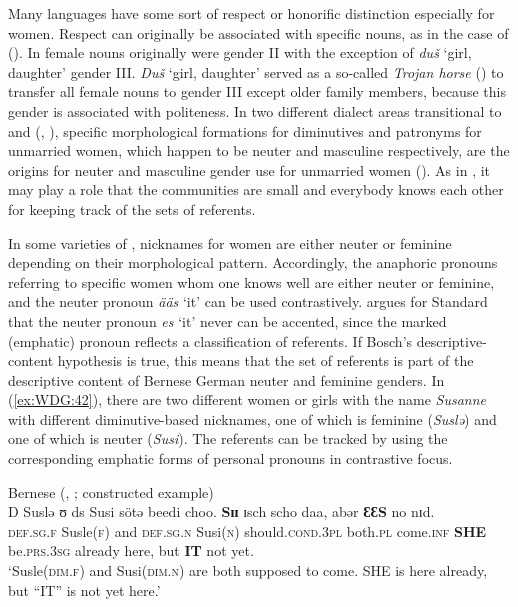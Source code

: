 \documentclass[output=collectionpaper]{langsci/langscibook}
\begin{document}
\largerpage
Many languages have some sort of respect or honorific distinction especially for women. Respect can originally be associated with specific nouns, as in the case of  (). In  female nouns originally were gender II with the exception of \textit{duš} `girl, daughter' gender III. \textit{Duš} `girl, daughter' served as a so-called \emph{Trojan horse} (\citealt[100]{Corbett1991}) to transfer all female nouns to gender III except older family members, because this gender is associated with politeness. In two different  dialect areas transitional to  and  (, ), specific morphological formations for diminutives and patronyms for unmarried women, which happen to be neuter and masculine respectively, are the origins for neuter and masculine gender use for unmarried women (\citealt[101]{Corbett1991}). As in , it may play a role that the communities are small and everybody knows each other for keeping track of the sets of referents.

In some varieties of , nicknames for women are either neuter or feminine depending on their morphological pattern. Accordingly, the anaphoric pronouns referring to specific women whom one knows well are either neuter or feminine, and the neuter pronoun \textit{ääs} `it' can be used contrastively. \cite[218]{Bosch1988} argues for Standard  that the neuter pronoun \textit{es} `it' never can be accented, since the marked (emphatic) pronoun reflects a classification of referents. If Bosch's descriptive-content hypothesis is true, this means that the set of referents is part of the descriptive content of Bernese German neuter and feminine genders. In (\ref{ex:WDG:42}), there are two different women or girls with the name \textit{Susanne} with different diminutive-based nicknames, one of which is feminine (\textit{Suslǝ}) and one of which is neuter (\textit{Susi}). The referents can be tracked by using the corresponding emphatic forms of personal pronouns in contrastive focus.

\ea\label{ex:WDG:42}
Bernese  (, ; constructed example)\\
\gll D	Suslǝ	ʊ	ds	Susi	sötǝ	beedi	choo. \textbf{Sɪɪ}	ɪsch	scho	daa,	abǝr	\textbf{ƐƐS}	no	nɪd.\\
\textsc{def.sg.f}	Susle(\textsc{f})	and	\textsc{def.sg.n}	Susi(\textsc{n})	should.\textsc{cond.3pl}	both.\textsc{pl}	come.\textsc{inf} \textbf{SHE}	be.\textsc{prs.3sg}	already	here,	but	\textbf{IT}	not	yet.\\
\glt `Susle(\textsc{dim.f}) and Susi(\textsc{dim.n}) are both supposed to come. SHE is here already, but ``IT'' is not yet here.'\\
\z
\end{document}
